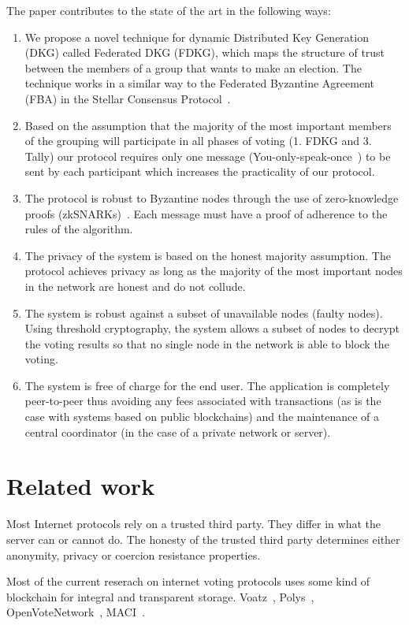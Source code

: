 \documentclass{article}
\begin{document}
The paper contributes to the state of the art in the following ways:
\begin{enumerate}
    \item We propose a novel technique for dynamic Distributed Key Generation (DKG) called Federated DKG (FDKG), which maps the structure of trust between the members of a group that wants to make an election. The technique works in a similar way to the Federated Byzantine Agreement (FBA) in the Stellar Consensus Protocol~\cite{mazieresStellarConsensusProtocol2015}.
    \item Based on the assumption that the majority of the most important members of the grouping will participate in all phases of voting (1. FDKG and 3. Tally) our protocol requires only one message (You-only-speak-once~\cite{gentryYOSOYouOnly2021}) to be sent by each participant which increases the practicality of our protocol.
    \item The protocol is robust to Byzantine nodes through the use of zero-knowledge proofs (zkSNARKs)~\cite{parnoPinocchioNearlyPractical2013}. Each message must have a proof of adherence to the rules of the algorithm.
    \item The privacy of the system is based on the honest majority assumption. The protocol achieves privacy as long as the majority of the most important nodes in the network are honest and do not collude.
    \item The system is robust against a subset of unavailable nodes (faulty nodes). Using threshold cryptography, the system allows a subset of nodes to decrypt the voting results so that no single node in the network is able to block the voting.
    \item The system is free of charge for the end user. The application is completely peer-to-peer thus avoiding any fees associated with transactions (as is the case with systems based on public blockchains) and the maintenance of a central coordinator (in the case of a private network or server).
\end{enumerate}

\section{Related work}
Most Internet protocols rely on a trusted third party. They differ in what the server can or cannot do. The honesty of the trusted third party determines either anonymity, privacy or coercion resistance properties.

Most of the current reserach on internet voting protocols uses some kind of blockchain for integral and transparent storage. 
Voatz~\cite{mooreWestVirginiaMobile2019}, 
Polys~\cite{PolysOnlineVoting}, 
OpenVoteNetwork~\cite{haoAnonymousVotingTworound2010}, MACI~\cite{ethereumfoundationMinimalAntiCollusionInfrastructure2022}.
\end{document}
